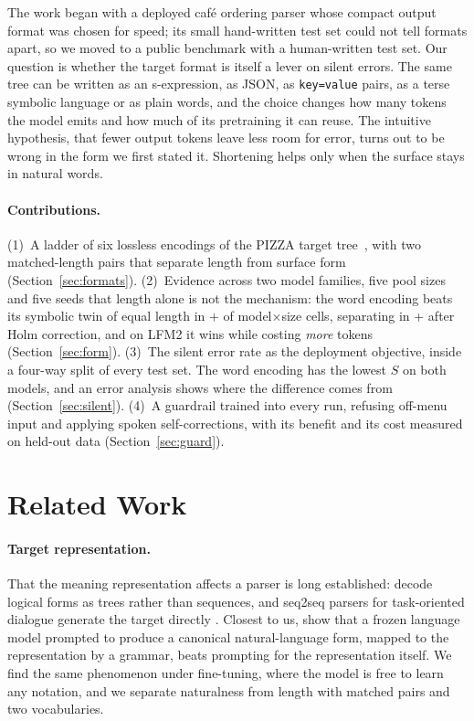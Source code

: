 \documentclass[11pt]{article}
\newcommand{\code}[1]{\texttt{#1}}
\begin{document}
The work began with a deployed café ordering parser whose compact output format
was chosen for speed; its small hand-written test set could not tell formats
apart, so we moved to a public benchmark with a human-written test set.
Our question is whether the target format is itself a lever on silent errors.
The same tree can be written as an s-expression, as JSON, as \code{key=value}
pairs, as a terse symbolic language or as plain words, and the choice changes how
many tokens the model emits and how much of its pretraining it can reuse. The
intuitive hypothesis, that fewer output tokens leave less room for error, turns
out to be wrong in the form we first stated it. Shortening helps only when the
surface stays in natural words.

\paragraph{Contributions.}
(1)~A ladder of six lossless encodings of the PIZZA target tree~\citep{pizza},
with two matched-length pairs that separate length from surface form
(Section~\ref{sec:formats}).
(2)~Evidence across two model families, five pool sizes and five seeds that
length alone is not the mechanism: the word encoding beats its symbolic twin of
equal length in \QwordsDslAhead{}+\LwordsDslAhead{} of \pairCells{} model$\times$size
cells, separating in \QwordsDslSep{}+\LwordsDslSep{} after Holm correction, and on
LFM2 it wins while costing \emph{more} tokens (Section~\ref{sec:form}).
(3)~The silent error rate as the deployment objective, inside a four-way split of
every test set. The word encoding has the lowest $S$ on both models, and an error
analysis shows where the difference comes from (Section~\ref{sec:silent}).
(4)~A guardrail trained into every run, refusing off-menu input and applying
spoken self-corrections, with its benefit and its cost measured on held-out data
(Section~\ref{sec:guard}).

\section{Related Work}

\paragraph{Target representation.}
That the meaning representation affects a parser is long established:
\citet{donglapata} decode logical forms as trees rather than sequences, and
seq2seq parsers for task-oriented dialogue generate the target directly
\citep{rongali}. Closest to us, \citet{shin} show that a frozen language model
prompted to produce a canonical natural-language form, mapped to the
representation by a grammar, beats prompting for the representation itself. We
find the same phenomenon under fine-tuning, where the model is free to learn any
notation, and we separate naturalness from length with matched pairs and two
vocabularies.
\end{document}
